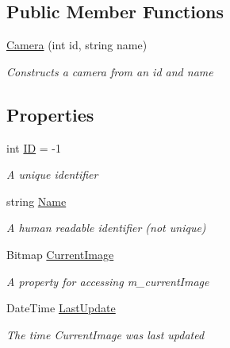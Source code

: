 \subsection*{Public Member Functions}
\begin{DoxyCompactItemize}
\item 
\mbox{\hyperlink{class_eagle_eye_1_1_models_1_1_camera_adcf152a7ad61686c8dd0a5ac919405b1}{Camera}} (int id, string name)
\begin{DoxyCompactList}\small\item\em Constructs a camera from an id and name \end{DoxyCompactList}\end{DoxyCompactItemize}
\subsection*{Properties}
\begin{DoxyCompactItemize}
\item 
int \mbox{\hyperlink{class_eagle_eye_1_1_models_1_1_camera_af3877a74fe147e2a79cd97d6a1d983da}{ID}} = -\/1
\begin{DoxyCompactList}\small\item\em A unique identifier \end{DoxyCompactList}\item 
string \mbox{\hyperlink{class_eagle_eye_1_1_models_1_1_camera_a45941e18deb09a8e294e7c858da9caa0}{Name}}
\begin{DoxyCompactList}\small\item\em A human readable identifier (not unique) \end{DoxyCompactList}\item 
Bitmap \mbox{\hyperlink{class_eagle_eye_1_1_models_1_1_camera_a1a5cec582d29956df5f3f3b3cf03c542}{Current\+Image}}
\begin{DoxyCompactList}\small\item\em A property for accessing m\+\_\+current\+Image \end{DoxyCompactList}\item 
Date\+Time \mbox{\hyperlink{class_eagle_eye_1_1_models_1_1_camera_ac9623f8d222175f53b06fa84420fa6cb}{Last\+Update}}
\begin{DoxyCompactList}\small\item\em The time Current\+Image was last updated \end{DoxyCompactList}\end{DoxyCompactItemize}
